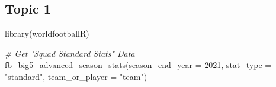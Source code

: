 \documentclass[
]{book}
\newenvironment{Shaded}{\begin{snugshade}}{\end{snugshade}}
\newcommand{\AttributeTok}[1]{\textcolor[rgb]{0.77,0.63,0.00}{#1}}
\newcommand{\CommentTok}[1]{\textcolor[rgb]{0.56,0.35,0.01}{\textit{#1}}}
\newcommand{\DecValTok}[1]{\textcolor[rgb]{0.00,0.00,0.81}{#1}}
\newcommand{\FunctionTok}[1]{\textcolor[rgb]{0.00,0.00,0.00}{#1}}
\newcommand{\NormalTok}[1]{#1}
\newcommand{\StringTok}[1]{\textcolor[rgb]{0.31,0.60,0.02}{#1}}
\theoremstyle{definition}
\theoremstyle{definition}
\theoremstyle{definition}
\theoremstyle{definition}
\theoremstyle{remark}
\begin{document}
\hypertarget{topic-1}{%
\subsection{Topic 1}\label{topic-1}}

\begin{Shaded}
\begin{Highlighting}[]
\FunctionTok{library}\NormalTok{(worldfootballR)}
\end{Highlighting}
\end{Shaded}

\begin{Shaded}
\begin{Highlighting}[]
\CommentTok{\# Get "Squad Standard Stats" Data}
\FunctionTok{fb\_big5\_advanced\_season\_stats}\NormalTok{(}\AttributeTok{season\_end\_year =} \DecValTok{2021}\NormalTok{, }\AttributeTok{stat\_type =} \StringTok{"standard"}\NormalTok{, }\AttributeTok{team\_or\_player =} \StringTok{"team"}\NormalTok{)}
\end{Highlighting}
\end{Shaded}
\end{document}

